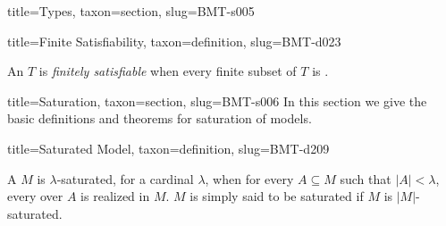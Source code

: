 \documentclass[a4paper]{article}
\begin{document}
\begin{tree}{title={Types}, taxon={section}, slug={BMT-s005}}
\begin{tree}{title={Finite Satisfiability}, taxon={definition}, slug={BMT-d023}}

    An  \(T\) is \emph{finitely satisfiable} when every finite subset of \(T\) is .

\end{tree}

\end{tree}


  
  
\begin{tree}{title={Saturation}, taxon={section}, slug={BMT-s006}}
In this section we give the basic definitions and theorems for saturation of models.
\begin{tree}{title={Saturated Model}, taxon={definition}, slug={BMT-d209}}

    A  \(M\) is \(\lambda\)-saturated, for a cardinal \(\lambda\), when for every \(A \subseteq  M\) such that \(|A|< \lambda\), every  over \(A\) is realized in \(M\). \(M\) is simply said to be saturated if \(M\) is \(|M|\)-saturated.

\end{tree}

\end{tree}


  
  
\end{document}
